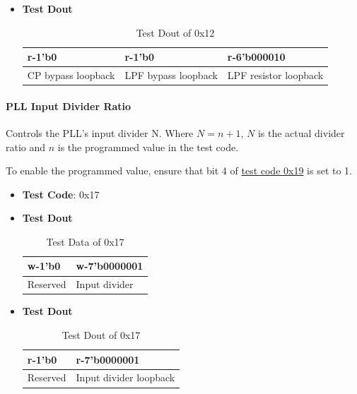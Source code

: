 \documentclass[main\_\_EN.tex]{subfiles}
\begin{document}
\begin{itemize}
\begin{itemize}
\begin{itemize}
                \end{itemize}
        \end{itemize}
    \item \textbf{Test Dout}
        \begin{longtable}{ |p{4cm}|p{4cm}|p{4cm}|}
            \caption{Test Dout of 0x12}
            \label{tab:test-dout-0x12} \\
            \hline
            \rowcolor{lightgray}
            \textbf{r-1'b0} & \textbf{r-1'b0} & \textbf{r-6'b000010} \\ \hline
            CP bypass loopback & LPF bypass loopback & LPF resistor loopback \\ \hline
        \end{longtable}
\end{itemize}


\paragraph{PLL Input Divider Ratio}
\label{sec:test-code-0x17}
Controls the PLL's input divider N. Where $N = n + 1$, $N$ is the actual divider ratio and $n$ is the programmed value in the test code.

To enable the programmed value, ensure that bit 4 of \hyperref[sec:test-code-0x19]{test code 0x19} is set to 1.

\begin{itemize}
    \item \textbf{Test Code}: 0x17
    \item \textbf{Test Dout} 
        \begin{longtable}{ |p{6cm}|p{6cm}|}
            \caption{Test Data of 0x17}
            \label{tab:test-data-0x17} \\
            \hline
            \rowcolor{lightgray}
            \textbf{w-1'b0} & \textbf{w-7'b0000001} \\ \hline
            Reserved & Input divider  \\ \hline
        \end{longtable}
    \item \textbf{Test Dout}
        \begin{longtable}{ |p{6cm}|p{6cm}|}
            \caption{Test Dout of 0x17}
            \label{tab:test-dout-0x17} \\
            \hline
            \rowcolor{lightgray}
            \textbf{r-1'b0} & \textbf{r-7'b0000001} \\ \hline
            Reserved & Input divider loopback \\ \hline
        \end{longtable}
\end{itemize}
\end{document}
